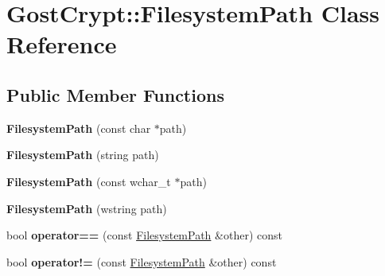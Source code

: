\hypertarget{class_gost_crypt_1_1_filesystem_path}{}\section{Gost\+Crypt\+:\+:Filesystem\+Path Class Reference}
\label{class_gost_crypt_1_1_filesystem_path}
\subsection*{Public Member Functions}
\begin{DoxyCompactItemize}
\item 
\mbox{\label{class_gost_crypt_1_1_filesystem_path_a3e0c4fb86efd094b1f3d071dde5121bc}} 
{\bfseries Filesystem\+Path} (const char $\ast$path)
\item 
\mbox{\label{class_gost_crypt_1_1_filesystem_path_a3d5133c41939ac0e1c27b426df968cc6}} 
{\bfseries Filesystem\+Path} (string path)
\item 
\mbox{\label{class_gost_crypt_1_1_filesystem_path_a676b4209ad6d460e04f5f9d7bbd1ae7e}} 
{\bfseries Filesystem\+Path} (const wchar\+\_\+t $\ast$path)
\item 
\mbox{\label{class_gost_crypt_1_1_filesystem_path_a948be46563656cb3e916405029d19423}} 
{\bfseries Filesystem\+Path} (wstring path)
\item 
\mbox{\label{class_gost_crypt_1_1_filesystem_path_a4c9c81d0eb59907ed031590bf62915b3}} 
bool {\bfseries operator==} (const \hyperlink{class_gost_crypt_1_1_filesystem_path}{Filesystem\+Path} \&other) const
\item 
\mbox{\label{class_gost_crypt_1_1_filesystem_path_ae53ae6af37e7da684acb9bb7a424f8b3}} 
bool {\bfseries operator!=} (const \hyperlink{class_gost_crypt_1_1_filesystem_path}{Filesystem\+Path} \&other) const
\item 
\mbox{\label{class_gost_crypt_1_1_filesystem_path_a81237b0616a49be28c21b561f05e5e88}} 

\end{DoxyCompactItemize}
